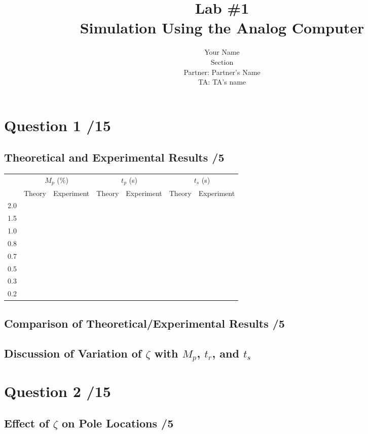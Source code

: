\documentclass{article}
\title{Lab \#1\\{\sc Simulation Using the Analog Computer}}
\author{Your Name\\ Section\\
  Partner: Partner's Name\\
  TA: TA's name}
\newcommand{\score}{\hfill \underline{\hspace{1cm}}/}
\begin{document}
\maketitle
{}

\section*{Question 1 \score 15}
\subsection*{Theoretical and Experimental Results \score 5}
\begin{center}
\begin{tabular}{crrrrrr}
& \multicolumn{2}{c}{$M_p$ (\%)} & \multicolumn{2}{c}{$t_p$ (s)} & \multicolumn{2}{c}{$t_s$ (s)} \\
& Theory & Experiment & Theory & Experiment & Theory & Experiment \\
\hline
2.0 \\
1.5 \\
1.0 \\
0.8 \\
0.7 \\
0.5 \\
0.3 \\
0.2
\end{tabular}
\end{center}

\subsection*{Comparison of Theoretical/Experimental Results \score 5}

\subsection*{Discussion of Variation of $\zeta$ with $M_p$, $t_r$, and $t_s$}

\section*{Question 2 \score 15}

\subsection*{Effect of $\zeta$ on Pole Locations \score 5}
\end{document}
